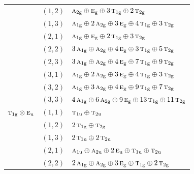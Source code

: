 \documentclass[11pt]{article}
\newcommand{\irr}[1]{\text{\normalfont\scshape #1}}
\newcommand{\ptag}[1]{\mathrm{#1}}
\begin{document}
\begin{longtable}{p{} c p{}}
 & $(1,2)$ & $\irr{a}_{2\ptag{g}}\oplus \irr{e}_{\ptag{g}}\oplus 3\,\irr{t}_{1\ptag{g}}\oplus 2\,\irr{t}_{2\ptag{g}}$\\

 & $(1,3)$ & $\irr{a}_{1\ptag{g}}\oplus 2\,\irr{a}_{2\ptag{g}}\oplus 3\,\irr{e}_{\ptag{g}}\oplus 4\,\irr{t}_{1\ptag{g}}\oplus 3\,\irr{t}_{2\ptag{g}}$\\

 & $(2,1)$ & $\irr{a}_{1\ptag{g}}\oplus \irr{e}_{\ptag{g}}\oplus 2\,\irr{t}_{1\ptag{g}}\oplus 3\,\irr{t}_{2\ptag{g}}$\\

 & $(2,2)$ & $3\,\irr{a}_{1\ptag{g}}\oplus \irr{a}_{2\ptag{g}}\oplus 4\,\irr{e}_{\ptag{g}}\oplus 3\,\irr{t}_{1\ptag{g}}\oplus 5\,\irr{t}_{2\ptag{g}}$\\

 & $(2,3)$ & $3\,\irr{a}_{1\ptag{g}}\oplus \irr{a}_{2\ptag{g}}\oplus 4\,\irr{e}_{\ptag{g}}\oplus 7\,\irr{t}_{1\ptag{g}}\oplus 9\,\irr{t}_{2\ptag{g}}$\\

 & $(3,1)$ & $\irr{a}_{1\ptag{g}}\oplus 2\,\irr{a}_{2\ptag{g}}\oplus 3\,\irr{e}_{\ptag{g}}\oplus 4\,\irr{t}_{1\ptag{g}}\oplus 3\,\irr{t}_{2\ptag{g}}$\\

 & $(3,2)$ & $\irr{a}_{1\ptag{g}}\oplus 3\,\irr{a}_{2\ptag{g}}\oplus 4\,\irr{e}_{\ptag{g}}\oplus 9\,\irr{t}_{1\ptag{g}}\oplus 7\,\irr{t}_{2\ptag{g}}$\\

 & $(3,3)$ & $4\,\irr{a}_{1\ptag{g}}\oplus 6\,\irr{a}_{2\ptag{g}}\oplus 9\,\irr{e}_{\ptag{g}}\oplus 13\,\irr{t}_{1\ptag{g}}\oplus 11\,\irr{t}_{2\ptag{g}}$\\

\hline

$\irr{t}_{1\ptag{g}}\otimes \irr{e}_{\ptag{u}}$ & $(1,1)$ & $\irr{t}_{1\ptag{u}}\oplus \irr{t}_{2\ptag{u}}$\\

 & $(1,2)$ & $2\,\irr{t}_{1\ptag{g}}\oplus \irr{t}_{2\ptag{g}}$\\

 & $(1,3)$ & $2\,\irr{t}_{1\ptag{u}}\oplus 2\,\irr{t}_{2\ptag{u}}$\\

 & $(2,1)$ & $\irr{a}_{1\ptag{u}}\oplus \irr{a}_{2\ptag{u}}\oplus 2\,\irr{e}_{\ptag{u}}\oplus \irr{t}_{1\ptag{u}}\oplus \irr{t}_{2\ptag{u}}$\\

 & $(2,2)$ & $2\,\irr{a}_{1\ptag{g}}\oplus \irr{a}_{2\ptag{g}}\oplus 3\,\irr{e}_{\ptag{g}}\oplus \irr{t}_{1\ptag{g}}\oplus 2\,\irr{t}_{2\ptag{g}}$\\


\end{longtable}
\end{document}
